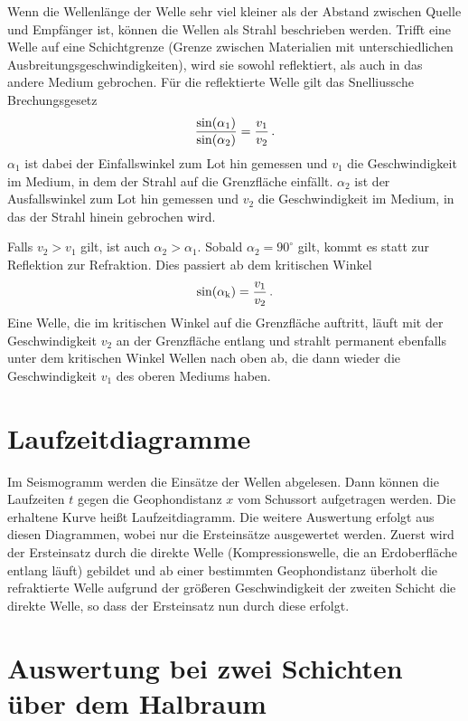 Wenn die Wellenlänge der Welle sehr viel kleiner als der Abstand zwischen Quelle und Empfänger ist, können die Wellen als Strahl beschrieben werden. Trifft eine Welle auf eine Schichtgrenze (Grenze zwischen Materialien mit unterschiedlichen Ausbreitungsgeschwindigkeiten), wird sie sowohl reflektiert, als auch in das andere Medium gebrochen. Für die reflektierte Welle gilt das Snelliussche Brechungsgesetz
\begin{equation}
 \frac{\sin(\alpha_1)}{\sin(\alpha_2)}=\frac{v_1}{v_2}\text{\,.}
\end{equation}
$\alpha_1$ ist dabei der Einfallswinkel zum Lot hin gemessen und $v_1$ die Geschwindigkeit im Medium, in dem der Strahl auf die Grenzfläche einfällt. $\alpha_2$ ist der Ausfallswinkel zum Lot hin gemessen und $v_2$ die Geschwindigkeit im Medium, in das der Strahl hinein gebrochen wird.

Falls $v_2>v_1$ gilt, ist auch $\alpha_2>\alpha_1$. Sobald $\alpha_2=90^\circ$ gilt, kommt es statt zur Reflektion zur Refraktion. Dies passiert ab dem kritischen Winkel
\begin{equation}
 \sin(\alpha_{\mathrm{k}}) =\frac{v_1}{v_2} \text{\,.}
\end{equation}
Eine Welle, die im kritischen Winkel auf die Grenzfläche auftritt, läuft mit der Geschwindigkeit $v_2$ an der Grenzfläche entlang und strahlt permanent ebenfalls unter dem kritischen Winkel Wellen nach oben ab, die dann wieder die Geschwindigkeit $v_1$ des oberen Mediums haben.

\section{Laufzeitdiagramme}

Im Seismogramm werden die Einsätze der Wellen abgelesen. Dann können die Laufzeiten $t$ gegen die Geophondistanz $x$ vom Schussort aufgetragen werden. Die erhaltene Kurve heißt Laufzeitdiagramm. Die weitere Auswertung erfolgt aus diesen Diagrammen, wobei nur die Ersteinsätze ausgewertet werden. Zuerst wird der Ersteinsatz durch die direkte Welle (Kompressionswelle, die an Erdoberfläche entlang läuft) gebildet und ab einer bestimmten Geophondistanz überholt die refraktierte Welle aufgrund der größeren Geschwindigkeit der zweiten Schicht die direkte Welle, so dass der Ersteinsatz nun durch diese erfolgt.

\section{Auswertung bei zwei Schichten über dem Halbraum}
\label{sec:zweiSchichten}

